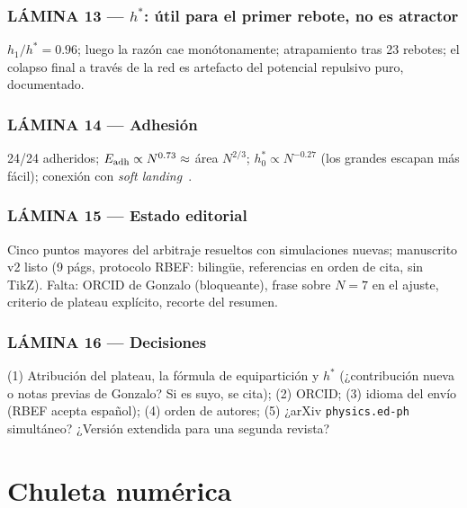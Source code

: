 \documentclass[11pt,a4paper]{article}
\begin{document}
\section*{LÁMINA 13 --- $h^*$: útil para el primer rebote, no es atractor}
$h_1/h^* = 0.96$; luego la razón cae monótonamente; atrapamiento tras 23
rebotes; el colapso final a través de la red es artefacto del potencial
repulsivo puro, documentado.

\section*{LÁMINA 14 --- Adhesión}
24/24 adheridos; $E_{\rm adh}\propto N^{0.73} \approx$ área $N^{2/3}$;
$h_0^* \propto N^{-0.27}$ (los grandes escapan más fácil); conexión con
\emph{soft landing}~\cite{Haberland1994,Awasthi2007}.

\section*{LÁMINA 15 --- Estado editorial}
Cinco puntos mayores del arbitraje resueltos con simulaciones nuevas;
manuscrito v2 listo (9 págs, protocolo RBEF: bilingüe, referencias en orden
de cita, sin TikZ). Falta: ORCID de Gonzalo (bloqueante), frase sobre $N=7$
en el ajuste, criterio de plateau explícito, recorte del resumen.

\section*{LÁMINA 16 --- Decisiones}
(1) Atribución del plateau, la fórmula de equipartición y $h^*$
(¿contribución nueva o notas previas de Gonzalo? Si es suyo, se cita);
(2) ORCID; (3) idioma del envío (RBEF acepta español); (4) orden de
autores; (5) ¿arXiv \texttt{physics.ed-ph} simultáneo? ¿Versión extendida
para una segunda revista?

\part{Chuleta numérica}
\end{document}
